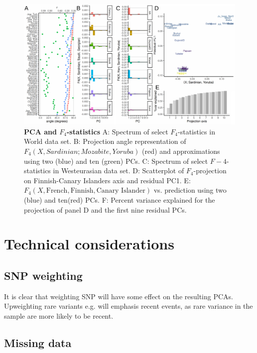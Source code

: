 \documentclass[10pt,a4paper]{article}
\begin{document}
\begin{figure}[!ht]
\includegraphics[width=\textwidth]{figures/fig_f4_data.pdf}	
	\caption{\textbf{PCA and $F_4$-statistics} A: Spectrum of select $F_4$-statistics in World data set. B: Projection angle representation of $F_4(X, Sardinian; Mozabite, Yoruba)$ (red) and approximations using two (blue) and ten (green) PCs. C: Spectrum of select $F-4$-statistics in Westeurasian data set. D: Scatterplot of $F_4$-projection on Finnish-Canary Islanders axis and residual PC1.
	E: $F_4(X, \text{French}, \text{Finnish}, \text{Canary Islander})$ vs. prediction using two (blue) and ten(red) PCs. F: Percent variance explained for the projection of panel D and the first nine residual PCs.
	}
\label{fig:f4}
\end{figure}


	
\section{Technical considerations}
	\subsection{SNP weighting}
	It is clear that weighting SNP will have some effect on the resulting PCAs. Upweighting rare variants e.g. will emphasis recent events, as rare variance in the sample are more likely to be recent.
	
	
	\subsection{Missing data}
	
\end{document}
